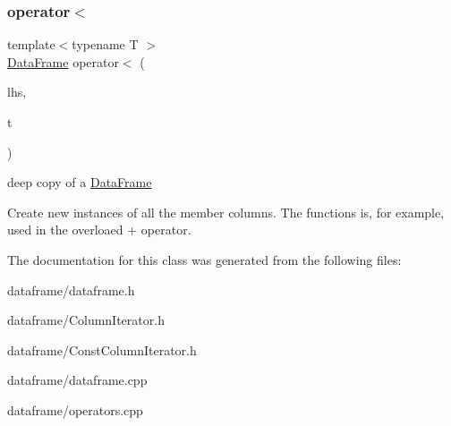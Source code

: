 \subsubsection{\texorpdfstring{operator$<$}{operator<}}
{\footnotesize\ttfamily template$<$typename T $>$ \\
\hyperlink{classDataFrame}{Data\+Frame} operator$<$ (\begin{DoxyParamCaption}\item[{const \hyperlink{classDataFrame}{Data\+Frame} \&}]{lhs,  }\item[{const T \&}]{t }\end{DoxyParamCaption})\hspace{0.3cm}{\ttfamily [friend]}}



deep copy of a \hyperlink{classDataFrame}{Data\+Frame} 

Create new instances of all the member columns. The functions is, for example, used in the overloaed + operator. 

The documentation for this class was generated from the following files\+:\begin{DoxyCompactItemize}
\item 
dataframe/dataframe.\+h\item 
dataframe/Column\+Iterator.\+h\item 
dataframe/Const\+Column\+Iterator.\+h\item 
dataframe/dataframe.\+cpp\item 
dataframe/operators.\+cpp\end{DoxyCompactItemize}
